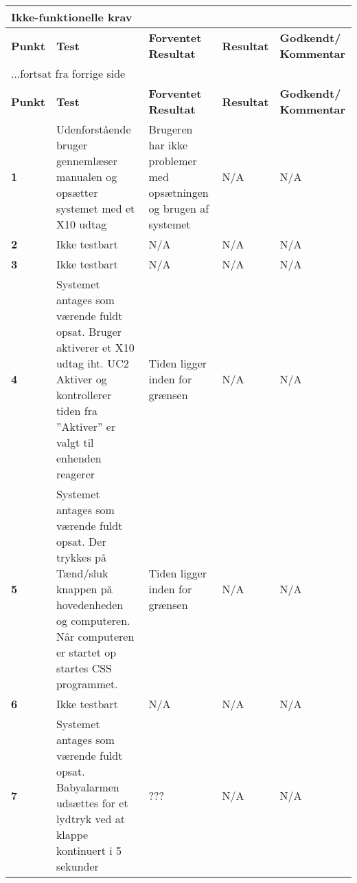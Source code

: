 
\begin{center}
\begin{longtable}{|p{}|p{}|p{3cm}|p{3cm}|p{3cm}|} %
\hline
\multicolumn{5}{|l|}{\textbf{Ikke-funktionelle krav}} \\ \hline
\textbf{Punkt} &
\textbf{Test} &
\textbf{Forventet \newline Resultat} &
\textbf{Resultat} &
\textbf{Godkendt/ \newline Kommentar} \\ \hline 
\endfirsthead

\multicolumn{5}{l}{...fortsat fra forrige side} \\ \hline 
\textbf{Punkt} &
\textbf{Test} &
\textbf{Forventet \newline Resultat} &
\textbf{Resultat} &
\textbf{Godkendt/ \newline Kommentar} \\ \hline 
\endhead


\textbf{1} &
Udenforstående bruger gennemlæser manualen og opsætter systemet med et X10 udtag &
Brugeren har ikke problemer med opsætningen og brugen af systemet &
N/A &
N/A \\\hline

\textbf{2} &
Ikke testbart &
N/A &
N/A &
N/A \\\hline

\textbf{3} &
Ikke testbart &
N/A &
N/A &
N/A \\\hline

\textbf{4} &
Systemet antages som værende fuldt opsat.\newline
Bruger aktiverer et X10 udtag iht. UC2 Aktiver og kontrollerer tiden fra ''Aktiver'' er valgt til enhenden reagerer&
Tiden ligger inden for grænsen &
N/A &
N/A \\\hline

\textbf{5} &
Systemet antages som værende fuldt opsat.\newline
Der trykkes på Tænd/sluk knappen på hovedenheden og computeren. Når computeren er startet op startes CSS programmet. &
Tiden ligger inden for grænsen &
N/A &
N/A \\\hline

\textbf{6} &
Ikke testbart &
N/A  &
N/A &
N/A \\\hline

\textbf{7} &
Systemet antages som værende fuldt opsat.\newline
Babyalarmen udsættes for et lydtryk ved at klappe kontinuert i 5 sekunder &
??? &
N/A &
N/A \\\hline


\end{longtable}
\end{center}
